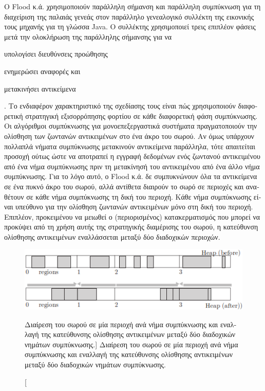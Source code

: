 \begin{greek}
 Ο Flood κ.ά. \cite{DBLP:conf/jvm/FloodDSZ01} χρησιμοποιούν παράλληλη
 σήμανση και παράλληλη συμπύκνωση για τη διαχείριση της παλαιάς
 γενεάς στον παράλληλο γενεαλογικό συλλέκτη της εικονικής τους
 μηχανής για τη γλώσσα Java. Ο συλλέκτης χρησιμοποιεί τρεις επιπλέον
 φάσεις μετά την ολοκλήρωση της παράλληλης σήμανσης για να
 \begin{inparaenum}[(i)]
 \item υπολογίσει διευθύνσεις προώθησης
 \item ενημερώσει αναφορές και
 \item μετακινήσει αντικείμενα
 \end{inparaenum}. Το ενδιαφέρον χαρακτηριστικό της σχεδίασης
 τους είναι πώς χρησιμοποιούν διαφορετική στρατηγική εξισορρόπησης
 φορτίου σε κάθε διαφορετική φάση συμπύκνωσης. Οι αλγόριθμοι
 συμπύκνωσης για μονοεπεξεργαστικά συστήματα πραγματοποιούν την
 ολίσθηση των ζωντανών αντικειμένων στο ένα άκρο του σωρού.
 Αν όμως υπάρχουν πολλαπλά νήματα συμπύκνωσης μετακινούν αντικείμενα
 παράλληλα, τότε απαιτείται προσοχή ούτως ώστε να αποτραπεί η
 εγγραφή δεδομένων ενός ζωντανού αντικειμένου από ένα νήμα
 συμπύκνωσης πριν τη μετακίνησή του αντικειμένου από ένα άλλο
 νήμα συμπύκνωσης. Για το λόγο αυτό, ο Flood κ.ά. δε συμπυκνώνουν
 όλα τα αντικείμενα σε ένα πυκνό άκρο του σωρού, αλλά αντίθετα
 διαιρούν το σωρό σε περιοχές και αναθέτουν σε κάθε νήμα συμπύκνωσης
 τη δική του περιοχή. Κάθε νήμα συμπύκνωσης είναι υπεύθυνο για
 την ολίσθηση ζωντανών αντικειμένων μόνο στη δική του περιοχή.
 Επιπλέον, προκειμένου να μειωθεί ο (περιορισμένος) κατακερματισμός
 που μπορεί να προκύψει από τη χρήση αυτής της στρατηγικής
 διαμέρισης του σωρού, η κατεύθυνση ολίσθησης αντικειμένων
 εναλλάσσεται μεταξύ δύο διαδοχικών περιοχών. 

\begin{figure}[H]
  \centering
  \includegraphics{figures/par_5}
  \caption
    [Διαίρεση του σωρού σε μία περιοχή ανά νήμα συμπύκνωσης
     και εναλλαγή της κατεύθυνσης ολίσθησης αντικειμένων μεταξύ
     δύο διαδοχικών νημάτων συμπύκνωσης.]
    {Διαίρεση του σωρού σε μία περιοχή ανά νήμα συμπύκνωσης
     και εναλλαγή της κατεύθυνσης ολίσθησης αντικειμένων μεταξύ
     δύο διαδοχικών νημάτων συμπύκνωσης.}
  \label{fig:par_5}
\end{figure}


\end{greek}
